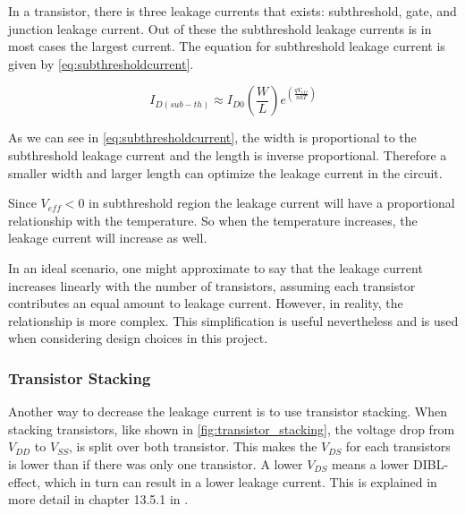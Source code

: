 In a transistor, there is three leakage currents that exists: subthreshold, gate, and
junction leakage current. Out of these the subthreshold leakage currents is in most cases the largest current. \cite[p.42]{Analog_integrated} The equation for subthreshold leakage current is given by \autoref{eq:subthresholdcurrent}. 

\begin{equation}
    \label{eq:subthresholdcurrent}
    I_{D(sub-th)} \approx I_{D0}\left(\frac{W}{L}\right)e^{\left(\frac{qV_{eff}}{nkT}\right)}
\end{equation}

As we can see in \autoref{eq:subthresholdcurrent}, the width is proportional to the subthreshold leakage current and the length is inverse proportional. Therefore a smaller width and larger length can optimize the leakage current in the circuit.

Since $V_{eff} < 0$ in subthreshold region the leakage current will have a proportional relationship with the temperature. So when the temperature increases, the leakage current will increase as well. 

In an ideal scenario, one might approximate to say that the leakage current increases linearly with the number of transistors, assuming each transistor contributes an equal amount to leakage current. However, in reality, the relationship is more complex. This simplification is useful nevertheless and is used when considering design choices in this project.

\subsubsection{Transistor Stacking}
Another way to decrease the leakage current is to use transistor stacking. When stacking transistors, like shown in \autoref{fig:transistor_stacking}, the voltage drop from $V_{DD}$ to $V_{SS}$, is split over both transistor. This makes the $V_{DS}$ for each transistors is lower than if there was only one transistor. A lower $V_{DS}$ means a lower DIBL-effect, which in turn can result in a lower leakage current. This is explained in more detail in chapter 13.5.1 in \cite{transistor_stacking}.

